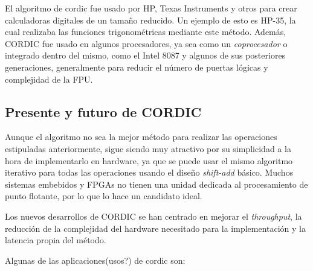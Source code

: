El algoritmo de \gls{cordic} fue usado por HP, Texas Instruments y otros para crear calculadoras digitales de un tamaño reducido. Un ejemplo de esto es HP-35, la cual realizaba las funciones trigonométricas mediante este método. Además, CORDIC fue usado en algunos procesadores, ya sea como un \textit{coprocesador} o integrado dentro del mismo, como el Intel 8087 y algunos de sus posteriores generaciones, generalmente para reducir el número de puertas lógicas y complejidad de la FPU.


\subsection{Presente y futuro de CORDIC}

Aunque el algoritmo no sea la mejor método para realizar las operaciones estipuladas anteriormente, sigue siendo muy atractivo por su simplicidad a la hora de implementarlo en hardware, ya que se puede usar el mismo algoritmo iterativo para todas las operaciones usando el diseño \textit{shift-add} básico. Muchos sistemas embebidos y FPGAs no tienen una unidad dedicada al procesamiento de punto flotante, por lo que lo hace un candidato ideal. 

Los nuevos desarrollos de CORDIC se han centrado en mejorar el \textit{throughput}, la reducción de la complejidad del hardware necesitado para la implementación y la latencia propia del método.

Algunas de las aplicaciones(usos?) de \gls{cordic} son:


